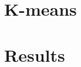 \documentclass[parskip=full]{report}
\begin{document}
\chapter{K-means}



\chapter{Results}
\end{document}
